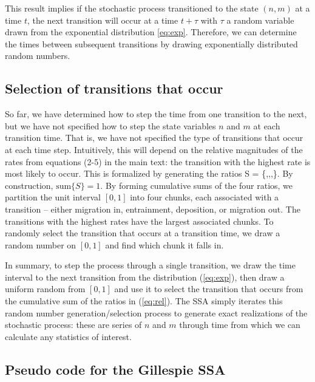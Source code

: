 This result implies if the stochastic process transitioned to the state $(n,m)$ at a time $t$, the next transition will occur at a time $t+\tau$ with $\tau$ a random variable drawn from the exponential distribution \ref{eq:exp}.
Therefore, we can determine the times between subsequent transitions by drawing exponentially distributed random numbers.

\subsection{Selection of transitions that occur}

So far, we have determined how to step the time from one transition to the next, but we have not specified how to step the state variables $n$ and $m$ at each transition time. 
That is, we have not specified the type of transitions that occur at each time step.
Intuitively, this will depend on the relative magnitudes of the rates from equations (2-5) in the main text: the transition with the highest rate is most likely to occur. This is formalized by generating the ratios
\be S = \Bigg\{,,,\Bigg\}. \label{eq:rel}\ee
By construction, $\text{sum}\{S\}=1$.
By forming cumulative sums of the four ratios, we partition the unit interval $[0,1]$ into four chunks, each associated with a transition -- either migration in, entrainment, deposition, or migration out. The transitions with the highest rates have the largest associated chunks. To randomly select the transition that occurs at a transition time, we draw a random number on $[0,1]$ and find which chunk it falls in.

In summary, to step the process through a single transition, we draw the time interval to the next transition from the distribution (\ref{eq:exp}), then draw a uniform random from $[0,1]$ and use it to select the transition that occurs from the cumulative sum of the ratios in (\ref{eq:rel}). The SSA simply iterates this random number generation/selection process to generate exact realizations of the stochastic process: these are series of $n$ and $m$ through time from which we can calculate any statistics of interest.

\subsection{Pseudo code for the Gillespie SSA}

